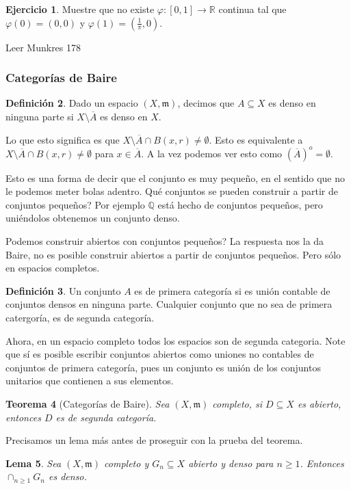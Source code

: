 \documentclass[12pt]{article}
\theoremstyle{plain}
\newtheorem{Th}{Teorema}[subsection]   %
\newtheorem{Lem}[Th]{Lema}             %
\theoremstyle{definition}
\newtheorem{Def}[Th]{Definición}       %
\newtheorem{Ej}[Th]{Ejercicio}
\theoremstyle{remark}
\numberwithin{equation}{section}
\newcommand{\bQ}{\mathbb{Q}}        %
\newcommand{\bR}{\mathbb{R}}        %
\newcommand{\mm}{\mathfrak{m}}      %
\renewcommand{\geq}{\geqslant}      %
\renewcommand{\:}{\colon}           %
\newcommand{\bonj}[1]{\left\lbrack#1\right\rbrack}
\begin{document}
\begin{multicols}{2}
\begin{Ej}
  Muestre que no existe $\varphi\colon\bonj{0,1}\to\bR$ continua tal que $\varphi(0)=(0,0)$ y $\varphi(1)=(\frac{1}{\pi},0)$.
\end{Ej}

Leer Munkres 178
\subsubsection*{Categorías de Baire}

\begin{Def}
  Dado un espacio $(X,\mm)$, decimos que $A\subseteq X$ es denso en ninguna parte si $X\setminus\overline{A}$ es denso en $X$.
\end{Def}

Lo que esto significa es que $X\setminus\overline{A}\cap B(x,r)\neq\emptyset$. Esto es equivalente a $X\setminus\overline{A}\cap B(x,r)\neq\emptyset$ para $x\in \overline{A}$. A la vez podemos ver esto como $(\overline{A})^o=\emptyset$.\par
Esto es una forma de decir que el conjunto es muy pequeño, en el sentido que no le podemos meter bolas adentro. Qué conjuntos se pueden construir a partir de conjuntos pequeños? Por ejemplo $\bQ$ está hecho de conjuntos pequeños, pero uniéndolos obtenemos un conjunto denso.\par
Podemos construir abiertos con conjuntos pequeños? La respuesta nos la da Baire, no es posible construir abiertos a partir de conjuntos pequeños. Pero sólo en espacios completos.

\begin{Def}
  Un conjunto $A$ es de primera categoría si es unión contable de conjuntos densos en ninguna parte. Cualquier conjunto que no sea de primera catergoría, es de segunda categoría.
\end{Def}

Ahora, en un espacio completo todos los espacios son de segunda categoria. Note que sí es posible escribir conjuntos abiertos como uniones no contables de conjuntos de primera categoría, pues un conjunto es unión de los conjuntos unitarios que contienen a sus elementos.
\begin{Th}[Categorías de Baire]\label{thm:BaireCategories}
  Sea $(X,\mm)$ completo, si $D\subseteq X$ es abierto, entonces $D$ es de segunda categoría.
\end{Th}

Precisamos un lema más antes de proseguir con la prueba del teorema.

\begin{Lem}
  Sea $(X,\mm)$ completo y $G_n\subseteq X$ abierto y denso para $n\geq 1$. Entonces $\cap_{n\geq 1}G_n$ es denso.
\end{Lem}


\end{multicols}
\end{document}
